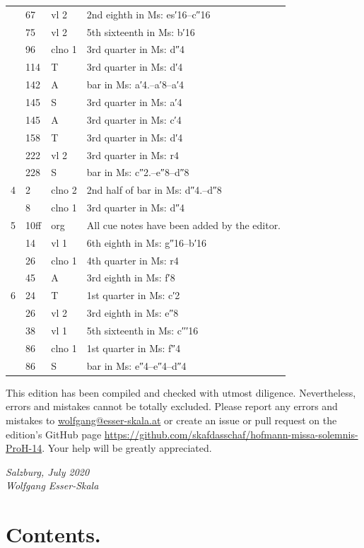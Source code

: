 \documentclass[parskip=full]{scrreprt}
\newif\iftemplate\templatetrue
\begin{document}
\begin{longtable}{lll L{10cm}}
	  & 67    & vl 2   & 2nd eighth in Ms: es′16–c″16 \\
	  & 75    & vl 2   & 5th sixteenth in Ms: b′16 \\
	  & 96    & clno 1 & 3rd quarter in Ms: d″4 \\
	  & 114   & T      & 3rd quarter in Ms: d′4 \\
	  & 142   & A      & bar in Ms: a′4.–a′8–a′4 \\
	  & 145   & S      & 3rd quarter in Ms: a′4 \\
	  & 145   & A      & 3rd quarter in Ms: c′4 \\
	  & 158   & T      & 3rd quarter in Ms: d′4 \\
	  & 222   & vl 2   & 3rd quarter in Ms: r4 \\
	  & 228   & S      & bar in Ms: c″2.–e″8–d″8 \\
	4 & 2     & clno 2 & 2nd half of bar in Ms: d″4.–d″8 \\
	  & 8     & clno 1 & 3rd quarter in Ms: d″4 \\
	5 & 10ff  & org    & All cue notes have been added by the editor. \\
	  & 14    & vl 1   & 6th eighth in Ms: g″16–b′16 \\
	  & 26    & clno 1 & 4th quarter in Ms: r4 \\
	  & 45    & A      & 3rd eighth in Ms: f′8 \\
	6 & 24    & T      & 1st quarter in Ms: c′2 \\
	  & 26    & vl 2   & 3rd eighth in Ms: e″8 \\
	  & 38    & vl 1   & 5th sixteenth in Ms: c′′′16 \\
	  & 86    & clno 1 & 1st quarter in Ms: f″4 \\
	  & 86    & S      & bar in Ms: e″4–e″4–d″4 \\
	\bottomrule
\end{longtable}


This edition has been compiled and checked with utmost diligence. Nevertheless, errors and mistakes cannot be totally excluded. Please report any errors and mistakes to \url{wolfgang@esser-skala.at} or create an issue or pull request on the edition’s GitHub page \url{https://github.com/skafdasschaf/hofmann-missa-solemnis-ProH-14}. Your help will be greatly appreciated.

\bigskip
\textit{Salzburg, July 2020\\
Wolfgang Esser-Skala}

\cleardoublepage
\chapter*{Contents.}


\cleardoublepage
\fi

\iftemplate

\fi
\end{document}
